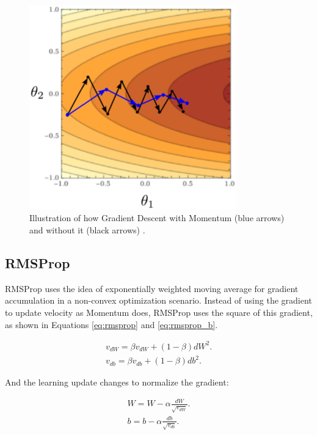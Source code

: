 \begin{figure}[!htbp]
	\centering
	\includegraphics[width=0.8\textwidth]{Cap3/momentum.eps}
	\caption{ Illustration of how Gradient Descent with Momentum (blue arrows) and without it (black arrows)
		\cite{tgilharco}.
	}
	\label{fig:momentum}
\end{figure}

\subsection{RMSProp}

RMSProp \cite{hinton2012} uses the idea of exponentially weighted moving average for gradient accumulation in a non-convex optimization scenario. Instead of using the gradient to update velocity as Momentum does, RMSProp uses the square of this gradient, as shown in Equations \ref{eq:rmsprop} and \ref{eq:rmsprop_b}.


\begin{align}\label{eq:rmsprop}
v_{dW} = \beta v_{dW} + (1 - \beta)dW^2.\\
v_{db} = \beta v_{db} + (1 - \beta)db^2.
\label{eq:rmsprop_b}
\end{align}

And the learning update changes to normalize the gradient:

\begin{align}\label{eq:rmspropupdate}
W = W - \alpha \frac{dW}{\sqrt{v_{dW}}}.\\
b = b - \alpha \frac{db}{\sqrt{v_{db}}}.\\
\label{eq:rmspropupdate_b}
\end{align}

